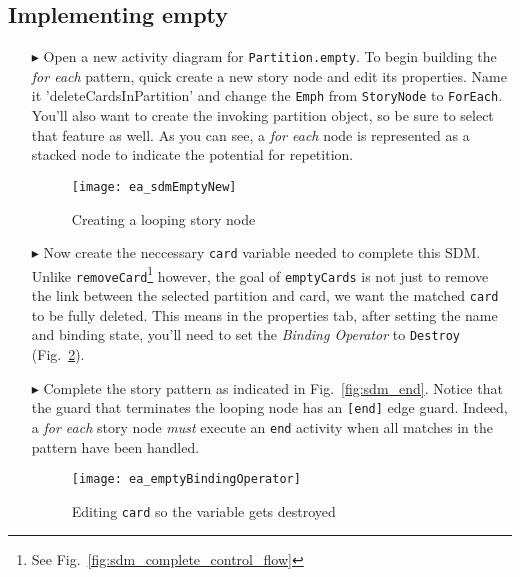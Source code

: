 \newpage
\subsection{Implementing empty}
\visHeader
\hypertarget{emptyPartition vis}{}

\begin{itemize}

\item[$\blacktriangleright$] Open a new activity diagram for \texttt{Partition.empty}. To begin building the \emph{for each} pattern, quick create a new story
node and edit its properties. Name it 'deleteCardsInPartition' and change the \texttt{Emph} from \texttt{StoryNode} to \texttt{ForEach}. You'll also want to
create the invoking partition object, so be sure to select that feature as well. As you can see, a \emph{for each} node is represented  as a stacked node to
indicate the potential for repetition.

\begin{figure}[htbp]
\begin{center}
  \texttt{[image: ea\_sdmEmptyNew]}
  \caption{Creating a looping story node}  
  \label{fig:sdm_foreach}
\end{center}
\end{figure}

\item[$\blacktriangleright$] Now create the neccessary \texttt{card} variable needed to complete this SDM. Unlike \texttt{removeCard}\footnote{See
Fig.~\ref{fig:sdm_complete_control_flow}} however, the goal of \texttt{emptyCards} is not just to remove the link between the selected partition and card, we
want the matched \texttt{card} to be fully deleted. This means in the properties tab, after setting the name and binding state, you'll need to set the \emph{Binding
Operator} to \texttt{Destroy} (Fig.~\ref{fig:sdm_bindingOperator}).

\item[$\blacktriangleright$] Complete the story pattern as indicated in Fig.~\ref{fig:sdm_end}. Notice that the guard that terminates the looping node has an
\texttt{[end]} edge guard. Indeed, a \emph{for each} story node \emph{must} execute an \texttt{end} activity when all matches in the pattern have been
handled.

\newpage

\begin{figure}[htbp]
\begin{center}
  \texttt{[image: ea\_emptyBindingOperator]}
  \caption{Editing \texttt{card} so the variable gets destroyed}  
  \label{fig:sdm_bindingOperator}
\end{center}
\end{figure}


\end{itemize}
